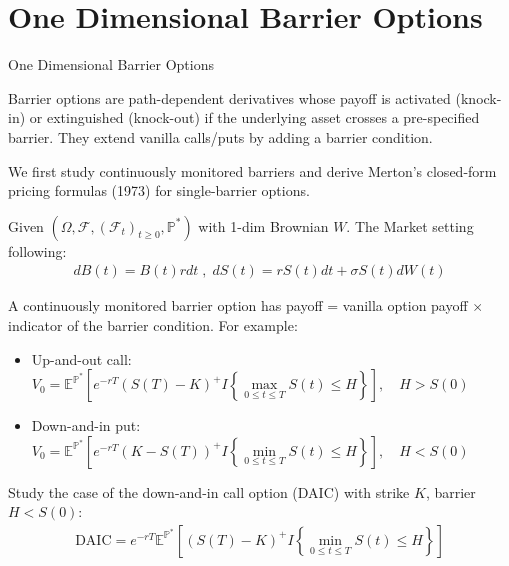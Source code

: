 \documentclass{beamer}
\begin{document}
\section{One Dimensional Barrier Options}
\begin{frame}{One Dimensional Barrier Options}

    {\footnotesize \footnotesize
    \par Barrier options are path-dependent derivatives whose payoff is activated (knock-in) or extinguished (knock-out) 
    if the underlying asset crosses a pre-specified barrier. They extend vanilla 
    calls/puts by adding a barrier condition.
    \par We first study continuously monitored barriers and derive 
    Merton's closed-form pricing formulas (1973) for single-barrier options.
    \par Given $(\Omega, \mathcal{F}, (\mathcal{F}_t)_{t \geq 0}, \mathbb{P}^*)$ with 1-dim Brownian $W$. 
    The Market setting following:
    \begin{align*}
        dB(t) =  B(t) r dt\;,\;dS(t) = r S(t)  dt + \sigma S(t)  dW(t)
    \end{align*}
    \par A continuously monitored barrier option has 
    payoff = vanilla option payoff \(\times\) indicator of the barrier condition. For example: 
    \begin{itemize}
        \item Up-and-out call: $V_0 = \mathbb{E}^{\mathbb{P}^*} \left[ e^{-rT} (S(T) - K)^+ I{\left\{ \max\limits_{0 \leq t \leq T} S(t) \leq H \right\}} \right], \quad H > S(0)$
        \item Down-and-in put: $ V_0 = \mathbb{E}^{\mathbb{P}^*} \left[ e^{-rT} (K - S(T))^+ I{\left\{ \min\limits_{0 \leq t \leq T} S(t) \leq H \right\}} \right], \quad H < S(0)$
    \end{itemize}
     \par Study the case of the down-and-in call option (DAIC) with strike \( K \), barrier \( H < S(0) \):
    \begin{align*}
        \text{DAIC} = e^{-rT}  \mathbb{E}^{\mathbb{P}^* }
        \left[ (S(T) - K)^+ I{\left\{\min\limits_{0 \leq t \leq T} S(t) \leq H \right\}} \right] 
    \end{align*}
    }
    
\end{frame}
\end{document}
